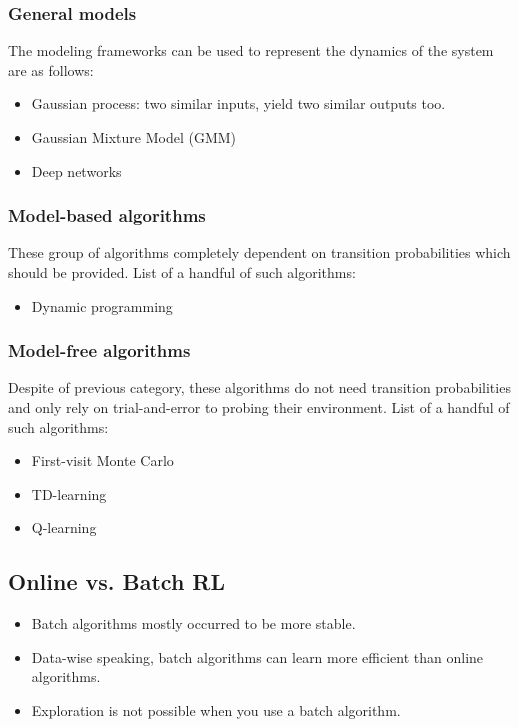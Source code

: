 \documentclass[letterpaper,12pt]{article}
\begin{document}
    \subsubsection{General models}
    The modeling frameworks can be used to represent the dynamics of the system are as follows:
    \begin{itemize}
        \item Gaussian process: two similar inputs, yield two similar outputs too.
        \item Gaussian Mixture Model (GMM)
        \item Deep networks
    \end{itemize}

    \subsubsection{Model-based algorithms}
    These group of algorithms completely dependent on transition probabilities which should be provided. List of a handful of such algorithms:
    \begin{itemize}
        \item Dynamic programming
    \end{itemize}

    \subsubsection{Model-free algorithms}
    Despite of previous category, these algorithms do not need transition probabilities and only rely on trial-and-error to probing their environment. List of a handful of such algorithms:
    \begin{itemize}
        \item First-visit Monte Carlo
        \item TD-learning
        \item Q-learning
    \end{itemize}

    \subsection{Online vs. Batch RL}
    \begin{itemize}
        \item Batch algorithms mostly occurred to be more stable.
        \item Data-wise speaking, batch algorithms can learn more efficient than online algorithms.
        \item Exploration is not possible when you use a batch algorithm.
    \end{itemize}
\end{document}
